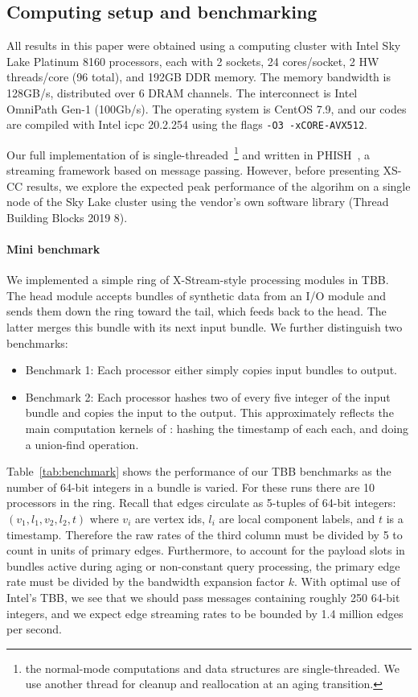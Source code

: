 \subsection{Computing setup and benchmarking}

All results in this paper were obtained using a computing cluster with
Intel Sky Lake Platinum 8160 processors, each with 2 sockets,
24 cores/socket, 2 HW threads/core (96 total), and 192GB DDR memory. The
memory bandwidth is 128GB/s, distributed over 6 DRAM channels.  The
interconnect is Intel OmniPath Gen-1 (100Gb/s).
The operating system is CentOS 7.9, and our codes are compiled with Intel icpc 
20.2.254 using the flags \verb+-O3 -xCORE-AVX512+.

Our full implementation of \XSCC is single-threaded~\footnote{the normal-mode
computations and data structures are single-threaded.  We use another thread
for cleanup and reallocation at an aging transition.} and
written in PHISH~\cite{phish}, a streaming
framework based on message passing.
However, before presenting XS-CC results,
we explore the expected peak performance of the algorihm on a single node of
the Sky Lake cluster using the vendor's own software library (Thread Building
Blocks 2019 8).

\paragraph{Mini benchmark}

We implemented a simple ring of X-Stream-style processing modules in TBB.
The head module
accepts bundles of synthetic data from an I/O module and sends them down the
ring toward the tail, which feeds back to the head. The latter merges this
bundle with its next input bundle.  We further distinguish two benchmarks:
\begin{itemize}
\item Benchmark 1: Each processor either simply copies input bundles to output.
\item Benchmark 2: Each processor hashes two of every five integer of the input bundle and copies the input to the output.  This approximately reflects the
main computation kernels of \XSCCns: hashing the timestamp of each each,
and doing a union-find operation.
\end{itemize}


Table~\ref{tab:benchmark} shows the performance of our TBB benchmarks as the
number of 64-bit integers in a bundle is varied. For these runs there are
10 processors in the ring.  Recall that \XSCC edges circulate as 5-tuples of
64-bit integers: $(v_1, l_1, v_2, l_2, t)$ where $v_i$ are vertex ids,
$l_i$ are local component labels, and $t$ is a timestamp.  Therefore the
raw rates of the third column must be divided by 5 to count in units of
\XStream primary edges.  Furthermore, to account for the payload slots in
\XSCC bundles active during aging or non-constant query processing,
the primary edge rate must be
divided by the bandwidth
expansion factor $k$. With optimal use of Intel's TBB, we see that we
should pass messages containing roughly 250 64-bit integers, and we
expect \XSCC edge streaming rates to be bounded by 1.4 million edges per
second.

